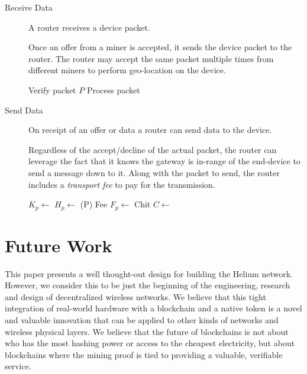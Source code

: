 \documentclass[10pt, nonatbib, nocopyrightspace, reprint]{sigplanconf}
\newenvironment{protocol}[2]{
  \begin{algorithm}[!htb]
    \DontPrintSemicolon
    \caption{#1}\label{#2}
}{
  \end{algorithm}
  \FloatBarrier
}
\begin{document}
\begin{description}
    \item [Receive Data] A router receives a device packet.

      Once an offer from a miner is accepted, it sends the device packet to the router. The router may accept the same packet multiple times from different miners to perform geo-location on the device.

    \begin{protocol}{Router Receive Data }{proto:router.data.recv}

       {
        Verify packet $P$ \;
        Process packet \;
      }
    \end{protocol}



    \item [Send Data] On receipt of an offer or data a router can send data to the device.

      Regardless of the accept/decline of the actual packet, the router can leverage the fact that it knows the gateway is in-range of the end-device to send a message down to it. Along with the packet to send, the router includes a \emph{transport fee} to pay for the transmission.

    \begin{protocol}{Router Send Data }{proto:router.data.send}

       {
        $K_p \leftarrow $  \;
        $H_p \leftarrow $ \Hash(P) \;
        Fee $F_p \leftarrow $  \;
        Chit $C \leftarrow $  \;
         \;
      }
    \end{protocol}


\end{description}

\fi

\section{Future Work}

This paper presents a well thought-out design for building the Helium network. However, we consider this to be just the beginning of the engineering, research and design of decentralized wireless networks. We believe that this tight integration of real-world hardware with a blockchain and a native token is a novel and valuable innovation that can be applied to other kinds of networks and wireless physical layers. We believe that the future of blockchains is not about who has the most hashing power or access to the cheapest electricity, but about blockchains where the mining proof is tied to providing a valuable, verifiable service.
\end{document}

